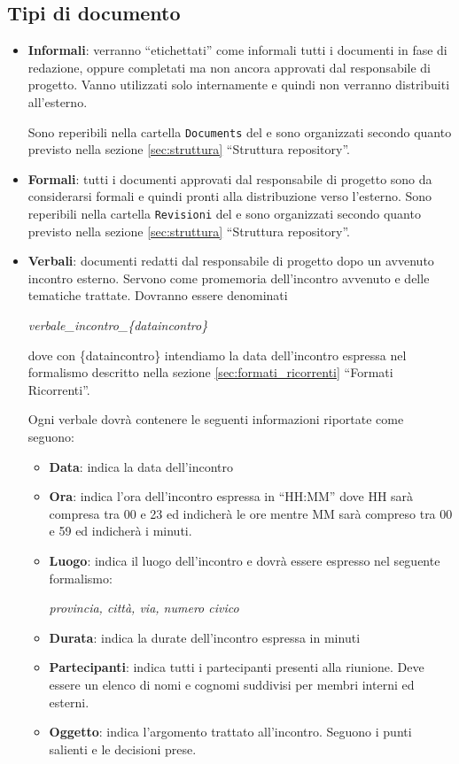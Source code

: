 \subsection{Tipi di documento}
\begin{itemize}
\item \textbf{Informali}: verranno ``etichettati'' come informali tutti i documenti in fase di redazione, oppure completati ma non ancora approvati dal responsabile di progetto. Vanno utilizzati solo internamente e quindi non verranno distribuiti all'esterno.

Sono reperibili nella cartella \verb+Documents+ del  e sono organizzati secondo quanto previsto nella sezione \ref{sec:struttura} ``Struttura repository''.
\item \textbf{Formali}: tutti i documenti approvati dal responsabile di progetto sono da considerarsi formali e quindi pronti alla distribuzione verso l'esterno. Sono reperibili nella cartella \verb+Revisioni+ del  e sono organizzati secondo quanto previsto nella sezione \ref{sec:struttura} ``Struttura repository''.
\item \textbf{Verbali}: documenti redatti dal responsabile di progetto dopo un avvenuto incontro esterno. Servono come promemoria dell'incontro avvenuto e delle tematiche trattate. Dovranno essere denominati
\begin{center}
\textit{verbale\_incontro\_\{dataincontro\}}
\end{center}
dove con \{dataincontro\} intendiamo la data dell'incontro espressa nel formalismo descritto nella sezione \ref{sec:formati_ricorrenti} ``Formati Ricorrenti''.

Ogni verbale dovrà contenere le seguenti informazioni riportate come seguono:
\begin{itemize}
\item \textbf{Data}: indica la data dell'incontro
\item \textbf{Ora}: indica l'ora dell'incontro espressa in ``HH:MM'' dove HH sarà compresa tra 00 e 23 ed indicherà le ore mentre MM sarà compreso tra 00 e 59 ed indicherà i minuti. 
\item \textbf{Luogo}: indica il luogo dell'incontro e dovrà essere espresso nel seguente formalismo:
\begin{center}
\textit{provincia, città, via, numero civico}
\end{center}
\item \textbf{Durata}: indica la durate dell'incontro espressa in minuti
\item \textbf{Partecipanti}: indica tutti i partecipanti presenti alla riunione. Deve essere un elenco di nomi e cognomi suddivisi per membri interni ed esterni.
\item \textbf{Oggetto}: indica l'argomento trattato all'incontro. Seguono i punti salienti e le decisioni prese.
\end{itemize}


\end{itemize}
